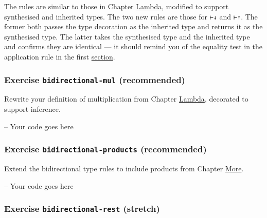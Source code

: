 The rules are similar to those in Chapter
\protect\hyperlink{Lambda}{Lambda}, modified to support synthesised and
inherited types. The two new rules are those for \texttt{⊢↓} and
\texttt{⊢↑}. The former both passes the type decoration as the inherited
type and returns it as the synthesised type. The latter takes the
synthesised type and the inherited type and confirms they are identical
--- it should remind you of the equality test in the application rule in
the first \protect\hyperlink{Inference-algorithms}{section}.

\hypertarget{Inference-bidirectional-mul}{%
\subsubsection{\texorpdfstring{Exercise \texttt{bidirectional-mul}
(recommended)}{Exercise bidirectional-mul (recommended)}}\label{Inference-bidirectional-mul}}

Rewrite your definition of multiplication from Chapter
\protect\hyperlink{Lambda}{Lambda}, decorated to support inference.

\begin{fence}
\begin{code}
-- Your code goes here
\end{code}
\end{fence}

\hypertarget{Inference-bidirectional-products}{%
\subsubsection{\texorpdfstring{Exercise \texttt{bidirectional-products}
(recommended)}{Exercise bidirectional-products (recommended)}}\label{Inference-bidirectional-products}}

Extend the bidirectional type rules to include products from Chapter
\protect\hyperlink{More}{More}.

\begin{fence}
\begin{code}
-- Your code goes here
\end{code}
\end{fence}

\hypertarget{exercise-bidirectional-rest-stretch}{%
\subsubsection{\texorpdfstring{Exercise \texttt{bidirectional-rest}
(stretch)}{Exercise bidirectional-rest (stretch)}}\label{exercise-bidirectional-rest-stretch}}

